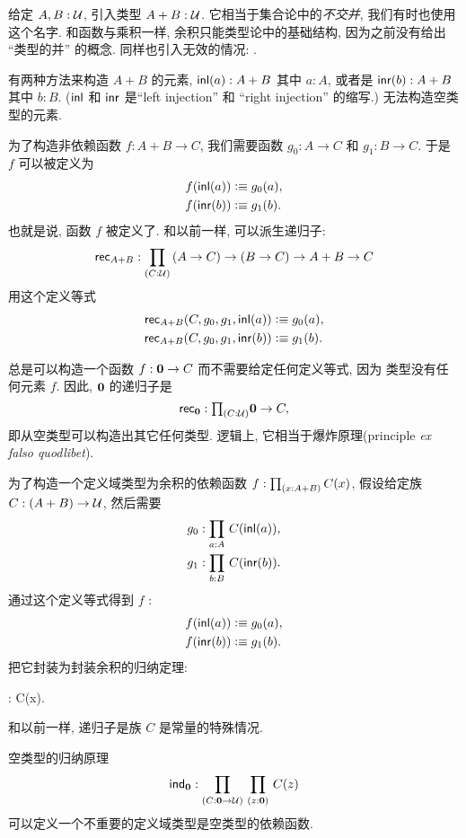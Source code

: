 给定 $A,B:\mathcal{U}$, 引入类型 $A+B:\mathcal{U}$.
%
%
%
%
%
%
它相当于集合论中的\emph{不交并}, 我们有时也使用这个名字.
和函数与乘积一样, 余积只能类型论中的基础结构, 因为之前没有给出 ``类型的并'' 的概念.
同样也引入无效的情况: .
%
%
%

有两种方法来构造 $A+B$ 的元素, ${\mathsf{inl}}(a) : A+B$ 其中 $a:A$, 或者是 ${\mathsf{inr}}(b):A+B$ 其中 $b:B$.
(${\mathsf{inl}}$ 和 ${\mathsf{inr}}$ 是``left injection'' 和 ``right injection'' 的缩写.)
无法构造空类型的元素.

为了构造非依赖函数 $f : A+B \to C$, 我们需要函数 $g_0 : A \to C$ 和 $g_1 : B \to C$.
于是 $f$ 可以被定义为
\begin{align*}
    f({\mathsf{inl}}(a)) &\vcentcolon\equiv g_0(a), \\
    f({\mathsf{inr}}(b)) &\vcentcolon\equiv g_1(b).
\end{align*}
也就是说, 函数 $f$ 被定义了.
%
和以前一样, 可以派生递归子:
%
\[ \rec{A+B} : \dprd{C:\UU}(A \to C) \to (B\to C) \to A+B \to C\]
用这个定义等式
\begin{align*}
    \mathsf{rec}_{A+B}(C,g_0,g_1,{\mathsf{inl}}(a)) &\vcentcolon\equiv g_0(a), \\
    \mathsf{rec}_{A+B}(C,g_0,g_1,{\mathsf{inr}}(b)) &\vcentcolon\equiv g_1(b).
\end{align*}

总是可以构造一个函数 $f : \mathbf{0} \to C$ 而不需要给定任何定义等式, 因为 \emptyt 类型没有任何元素 $f$.
因此, $\mathbf{0}$ 的递归子是
%
\[\rec{\emptyt} : \tprd{C:\UU} \emptyt \to C,\]
即从空类型可以构造出其它任何类型.
逻辑上, 它相当于爆炸原理(principle \textit{ex falso quodlibet}).

为了构造一个定义域类型为余积的依赖函数 $f:\prd{x:A+B}C(x)$, 假设给定族 $C: (A + B) \to \mathcal{U}$, 然后需要
\begin{align*}
    g_0 &: \prd{a:A} C(\inl(a)), \\
    g_1 &: \prd{b:B} C(\inr(b)).
\end{align*}
通过这个定义等式得到 $f$ :
\begin{align*}
    f({\mathsf{inl}}(a)) &\vcentcolon\equiv g_0(a), \\
    f({\mathsf{inr}}(b)) &\vcentcolon\equiv g_1(b).
\end{align*}
把它封装为封装余积的归纳定理:
%
\begin{narrowmultline*}
     :
     \to \narrowbreak
     \to {}C(x).
\end{narrowmultline*}
和以前一样, 递归子是族 $C$ 是常量的特殊情况.

空类型的归纳原理
%
\[ \ind{\emptyt} : \prd{C:\emptyt \to \UU}{z:\emptyt} C(z) \]
可以定义一个不重要的定义域类型是空类型的依赖函数.

%
%